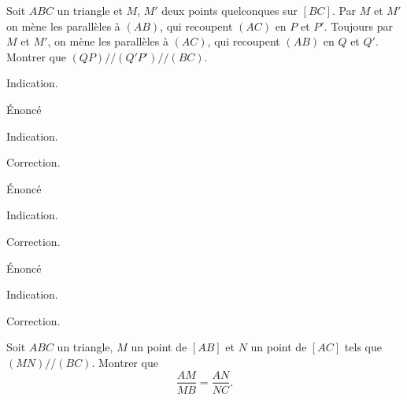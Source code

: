 \begin{exo}
Soit $ABC$ un triangle et $M$, $M'$ deux points quelconques sur $[BC]$.
Par $M$ et $M'$ on mène les parallèles à $(AB)$, qui recoupent $(AC)$ en $P$ et $P'$.
Toujours par $M$ et $M'$, on mène les parallèles à $(AC)$, qui recoupent $(AB)$ en $Q$ et $Q'$.
Montrer que $(QP)//(Q'P')//(BC)$.
\begin{hint}
Indication.
\end{hint}
\begin{sol}
\end{sol}
\end{exo}

\begin{exo}
Énoncé
\begin{hint}
Indication.
\end{hint}
\begin{sol}
Correction.
\end{sol}
\end{exo}

\begin{exo}
Énoncé
\begin{hint}
Indication.
\end{hint}
\begin{sol}
Correction.
\end{sol}
\end{exo}



\begin{exo}
Énoncé
\begin{hint}
Indication.
\end{hint}
\begin{sol}
Correction.
\end{sol}
\end{exo}



\begin{exo}
Soit $ABC$ un triangle, $M$ un point de $[AB]$ et $N$ un point de $[AC]$ tels que $(MN)//(BC)$. Montrer que 
\[ \frac{AM}{MB} = \frac{AN}{NC}.\]
\end{exo}







